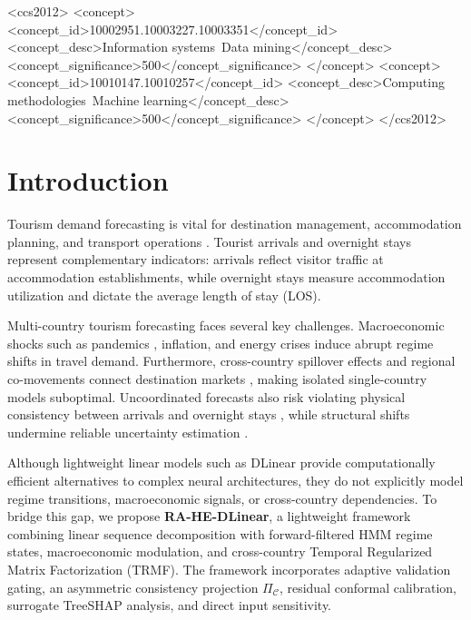 \documentclass[sigconf]{acmart}
\begin{document}
\begin{CCSXML}
<ccs2012>
   <concept>
       <concept_id>10002951.10003227.10003351</concept_id>
       <concept_desc>Information systems~Data mining</concept_desc>
       <concept_significance>500</concept_significance>
   </concept>
   <concept>
       <concept_id>10010147.10010257</concept_id>
       <concept_desc>Computing methodologies~Machine learning</concept_desc>
       <concept_significance>500</concept_significance>
   </concept>
</ccs2012>
\end{CCSXML}



\maketitle

\section{Introduction}
Tourism demand forecasting is vital for destination management, accommodation planning, and transport operations \cite{song2019tourism,clements1998forecasting}. Tourist arrivals and overnight stays represent complementary indicators: arrivals reflect visitor traffic at accommodation establishments, while overnight stays measure accommodation utilization and dictate the average length of stay (LOS).

Multi-country tourism forecasting faces several key challenges. Macroeconomic shocks such as pandemics \cite{gossling2020pandemics}, inflation, and energy crises induce abrupt regime shifts in travel demand. Furthermore, cross-country spillover effects and regional co-movements connect destination markets \cite{yang2019spatial,cang2014comparative}, making isolated single-country models suboptimal. Uncoordinated forecasts also risk violating physical consistency between arrivals and overnight stays \cite{kourentzes2019coherent}, while structural shifts undermine reliable uncertainty estimation \cite{barber2023conformal,gibbs2021adaptive}.

Although lightweight linear models such as DLinear \cite{zeng2023dlinear} provide computationally efficient alternatives to complex neural architectures, they do not explicitly model regime transitions, macroeconomic signals, or cross-country dependencies. To bridge this gap, we propose \textbf{RA-HE-DLinear}, a lightweight framework combining linear sequence decomposition with forward-filtered HMM regime states, macroeconomic modulation, and cross-country Temporal Regularized Matrix Factorization (TRMF). The framework incorporates adaptive validation gating, an asymmetric consistency projection $\Pi_{\mathcal{C}}$, residual conformal calibration, surrogate TreeSHAP analysis, and direct input sensitivity.
\end{document}
